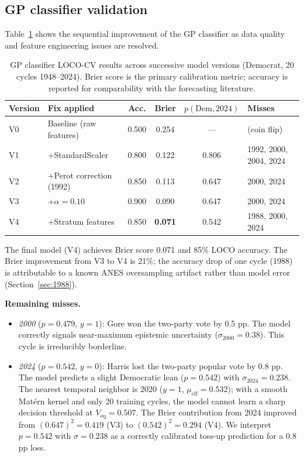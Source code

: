 \documentclass[12pt, letterpaper]{article}
\theoremstyle{definition}
\newcommand{\mueff}{\mu_{\mathrm{eff}}}
\newcommand{\Veq}{V_{\mathrm{eq}}}
\begin{document}
\subsection{GP classifier validation}
\label{sec:gp_results}

Table~\ref{tab:gp_progress} shows the sequential improvement of the GP
classifier as data quality and feature engineering issues are resolved.

\begin{table}[h]
\centering
\caption{GP classifier LOCO-CV results across successive model versions
(Democrat, 20 cycles 1948--2024). Brier score is the primary calibration
metric; accuracy is reported for comparability with the forecasting literature.}
\label{tab:gp_progress}
\begin{tabular}{llcccl}
\toprule
Version & Fix applied & Acc. & Brier & $p(\text{Dem}, 2024)$ & Misses \\
\midrule
V0 & Baseline (raw features) & 0.500 & 0.254 & --- & (coin flip) \\
V1 & +StandardScaler & 0.800 & 0.122 & 0.806 & 1992, 2000, 2004, 2024 \\
V2 & +Perot correction (1992) & 0.850 & 0.113 & 0.647 & 2000, 2024 \\
V3 & +$\alpha = 0.10$ & 0.900 & 0.090 & 0.647 & 2000, 2024 \\
V4 & +Stratum features & 0.850 & \textbf{0.071} & 0.542 & 1988, 2000, 2024 \\
\bottomrule
\end{tabular}
\end{table}

The final model (V4) achieves Brier score 0.071 and 85\% LOCO accuracy.
The Brier improvement from V3 to V4 is 21\%; the accuracy drop of one cycle
(1988) is attributable to a known ANES oversampling artifact rather than
model error (Section~\ref{sec:1988}).

\textbf{Remaining misses.}

\begin{itemize}
  \item \textit{2000} ($p = 0.479$, $y = 1$): Gore won the two-party vote by
    0.5 pp. The model correctly signals near-maximum epistemic uncertainty
    ($\sigma_{2000} = 0.38$). This cycle is irreducibly borderline.

  \item \textit{2024} ($p = 0.542$, $y = 0$): Harris lost the two-party
    popular vote by 0.8 pp. The model predicts a slight Democratic lean
    ($p = 0.542$) with $\sigma_{2024} = 0.238$. The nearest temporal
    neighbor is 2020 ($y = 1$, $\mueff = 0.532$); with a smooth Matérn
    kernel and only 20 training cycles, the model cannot learn a sharp
    decision threshold at $\Veq = 0.507$. The Brier contribution from 2024
    improved from $(0.647)^2 = 0.419$ (V3) to $(0.542)^2 = 0.294$ (V4).
    We interpret $p = 0.542$ with $\sigma = 0.238$ as a correctly
    calibrated toss-up prediction for a 0.8 pp loss.
\end{itemize}
\end{document}
